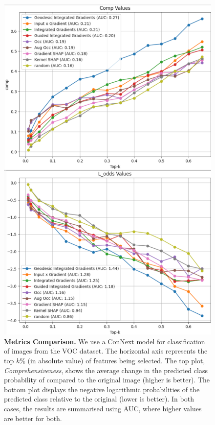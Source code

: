 \begin{figure}[!hbp]
	\vskip 0.2in
	\begin{center}
		\includegraphics[width=0.85\columnwidth]{figures/voc_metrics_vertical.png}
		\caption{ \textbf{Metrics Comparison.} We use a ConNext model for classification of images from the VOC dataset. The horizontal axis represents the top $k\%$ (in absolute value) of features being selected. The top plot, \textit{Comprehensiveness}, shows the average change in the predicted class probability of compared to the original image (higher is better). The bottom plot displays the negative logarithmic probabilities of the predicted class relative to the original (lower is better). In both cases, the results are summarised using AUC, where higher values are better for both.}
		\label{fig:voc_metrics}
	\end{center}
	\vskip -0.2in
\end{figure}

